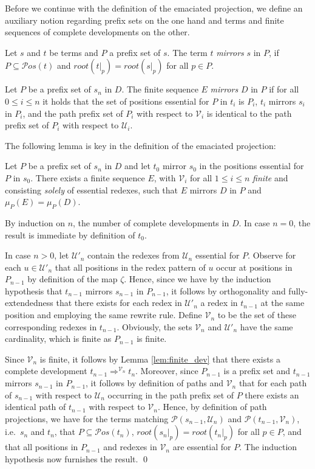 \documentclass{LMCS}
\theoremstyle{definition}
\newcommand{\pos}[1]{\mathcal{P}os(#1)}
\newcommand{\rs}[1]{root(#1)}
\newcommand{\dev}{\Rightarrow}
\newcommand{\pme}{\mu}
\newcommand{\pmep}[2]{\pme_{#1}({#2})}
\begin{document}
Before we continue with the definition of the emaciated projection, we define an auxiliary notion regarding prefix sets on the one hand and terms and finite sequences of complete developments on the other.
\begin{defi}
Let $s$ and $t$ be terms and $P$ a prefix set of $s$. The term $t$ \emph{mirrors} $s$ in $P$, if $P \subseteq \pos{t}$ and $\rs{t|_p} = \rs{s|_p}$ for all $p \in P$.

Let $P$ be a prefix set of $s_n$ in $D$. The finite sequence $E$ \emph{mirrors} $D$ in $P$ if for all $0 \leq i \leq n$ it holds that the set of positions essential for $P$ in $t_i$ is $P_i$, $t_i$ mirrors $s_i$ in $P_i$, and the path prefix set of $P_i$ with respect to $\mathcal{V}_i$ is identical to the path prefix set of $P_i$ with respect to $\mathcal{U}_i$.
\end{defi}

The following lemma is key in the definition of the emaciated projection:
\begin{lem}
\label{lem:simple_proj}
Let $P$ be a prefix set of $s_n$ in $D$ and let $t_0$ mirror $s_0$ in the positions essential for $P$ in $s_0$. There exists a finite sequence $E$, with $\mathcal{V}_i$ for all $1 \leq i \leq n$ \emph{finite} and consisting \emph{solely} of essential redexes, such that $E$ mirrors $D$ in $P$ and $\pmep{P}{E} = \pmep{P}{D}$.
\end{lem}

\proof
By induction on $n$, the number of complete developments in $D$. In case $n = 0$, the result is immediate by definition of $t_0$.

In case $n > 0$, let $\mathcal{U}'_n$ contain the redexes from $\mathcal{U}_n$ essential for $P$. Observe for each $u \in \mathcal{U}'_n$ that all positions in the redex pattern of $u$ occur at positions in $P_{n - 1}$ by definition of the map $\zeta$. Hence, since we have by the induction hypothesis that $t_{n - 1}$ mirrors $s_{n - 1}$ in $P_{n - 1}$, it follows by orthogonality and fully-extendedness that there exists for each redex in $\mathcal{U}'_n$ a redex in $t_{n - 1}$ at the same position and employing the same rewrite rule. Define $\mathcal{V}_n$ to be the set of these corresponding redexes in $t_{n - 1}$. Obviously, the sets $\mathcal{V}_n$ and $\mathcal{U}'_n$ have the same cardinality, which is finite as $P_{n - 1}$ is finite.

Since $\mathcal{V}_n$ is finite, it follows by Lemma \ref{lem:finite_dev} that there exists a complete development $t_{n-1} \dev^{\mathcal{V}_n} t_n$. Moreover, since $P_{n - 1}$ is a prefix set and $t_{n - 1}$ mirrors $s_{n - 1}$ in $P_{n - 1}$, it follows by definition of paths and $\mathcal{V}_n$ that for each path of $s_{n - 1}$ with respect to $\mathcal{U}_n$ occurring in the path prefix set of $P$ there exists an identical path of $t_{n - 1}$ with respect to $\mathcal{V}_n$. Hence, by definition of path projections, we have for the terms matching $\mathcal{P}(s_{n - 1}, \mathcal{U}_n)$ and $\mathcal{P}(t_{n - 1}, \mathcal{V}_n)$, i.e.\ $s_n$ and $t_n$, that $P \subseteq \pos{t_n}$, $\rs{s_n|_p} = \rs{t_n|_p}$ for all $p \in P$, and that all positions in $P_{n - 1}$ and redexes in $\mathcal{V}_n$ are essential for $P$. The induction hypothesis now furnishes the result.
\qed
\end{document}
